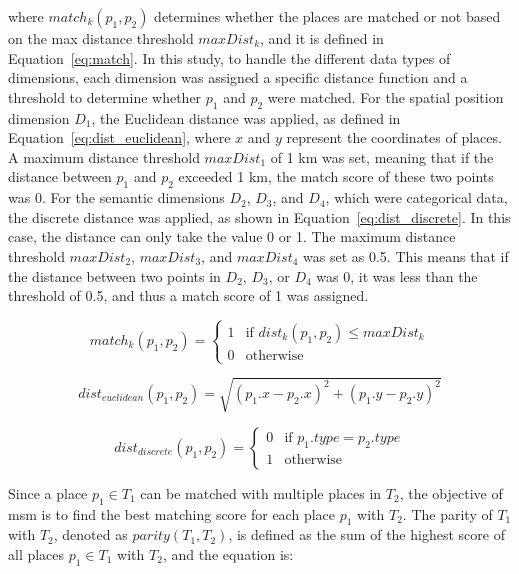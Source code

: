 \documentclass{article}
\theoremstyle{remark}
\begin{document}
where $match_{k}(p_{1},p_{2})$ determines whether the places are matched or not based on the max distance threshold $maxDist_{k}$, and it is defined in Equation~\ref{eq:match}. In this study, to handle the different data types of dimensions, each dimension was assigned a specific distance function and a threshold to determine whether $p_{1}$ and $p_{2}$ were matched. For the spatial position dimension $D_{1}$, the Euclidean distance was applied, as defined in Equation~\ref{eq:dist_euclidean}, where $x$ and $y$ represent the coordinates of places. A maximum distance threshold $maxDist_{1}$ of 1 km was set, meaning that if the distance between $p_{1}$ and $p_{2}$ exceeded 1 km, the match score of these two points was 0. For the semantic dimensions $D_{2}$, $D_{3}$, and $D_{4}$, which were categorical data, the discrete distance was applied, as shown in Equation~\ref{eq:dist_discrete}. In this case, the distance can only take the value 0 or 1. The maximum distance threshold $maxDist_{2}$, $maxDist_{3}$, and $maxDist_{4}$ was set as 0.5. This means that if the distance between two points in $D_{2}$, $D_{3}$, or $D_{4}$ was 0, it was less than the threshold of 0.5, and thus a match score of 1 was assigned.

\begin{equation} \label{eq:match}
    match_{k}(p_{1},p_{2}) = \begin{cases}
    1 & \text{if } dist_{k}(p_{1},p_{2}) \leq maxDist_{k}  \\
    0 & \text{otherwise}
    \end{cases}
\end{equation}

\begin{equation} \label{eq:dist_euclidean}
    dist_{euclidean}(p_{1},p_{2}) = \sqrt{(p_{1}.x-p_{2}.x)^2+(p_{1}.y-p_{2}.y)^2}
\end{equation}

\begin{equation} \label{eq:dist_discrete}
    dist_{discrete}(p_{1},p_{2}) = \begin{cases}
    0 & \text{if } p_{1}.type = p_{2}.type  \\
    1 & \text{otherwise}
    \end{cases}
\end{equation}

Since a place $p_{1} \in T_{1}$ can be matched with multiple places in $T_{2}$, the objective of \acrshort{msm} is to find the best matching score for each place $p_{1}$ with $T_{2}$. The parity of $T_{1}$ with $T_{2}$, denoted as $parity(T_{1},T_{2})$, is defined as the sum of the highest score of all places $p_{1} \in T_{1}$ with $T_{2}$, and the equation is:
\end{document}
